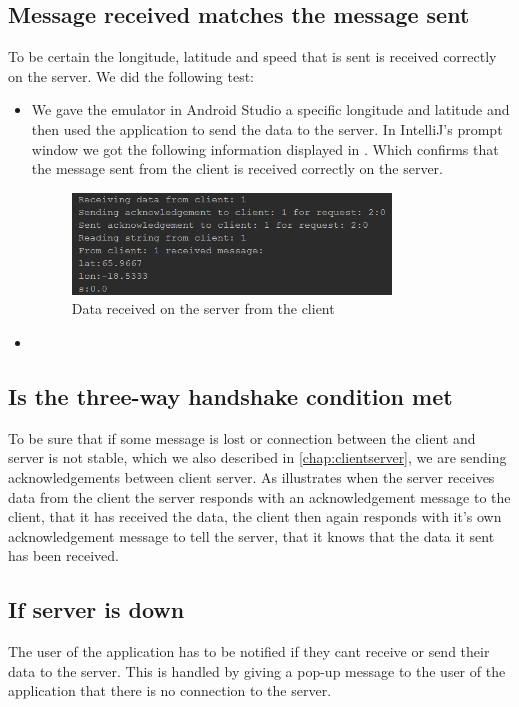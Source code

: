 \subsection{Message received matches the message sent}
To be certain the longitude, latitude and speed that is sent is received correctly on the server. We did the following test:
\begin{itemize}
	\item We gave the emulator in Android Studio a specific longitude and latitude and then used the application to send the data to the server. In IntelliJ's prompt window we got the following information displayed in . Which confirms that the message sent from the client is received correctly on the server.
	\begin{figure}[h!]
  \centering
    \includegraphics[width=0.8\textwidth]{figures/datasentfromclienttoserver.png}
    \caption{Data received on the server from the client}
    \label{fig:datasentfromclienttoserver}
\end{figure}
	\item {}
\end{itemize}

\subsection{Is the three-way handshake condition met }
To be sure that if some message is lost or connection between the client and server is not stable, which we also described in \autoref{chap:clientserver}, we are sending acknowledgements between client server. As   illustrates when the server receives data from the client the server responds with an acknowledgement message to the client, that it has received the data, the client then again responds with it's own acknowledgement message to tell the server, that it knows that the data it sent has been received.

\subsection{If server is down}
The user of the application has to be notified if they cant receive or send their data to the server. This is handled by giving a pop-up message to the user of the application that there is no connection to the server.

